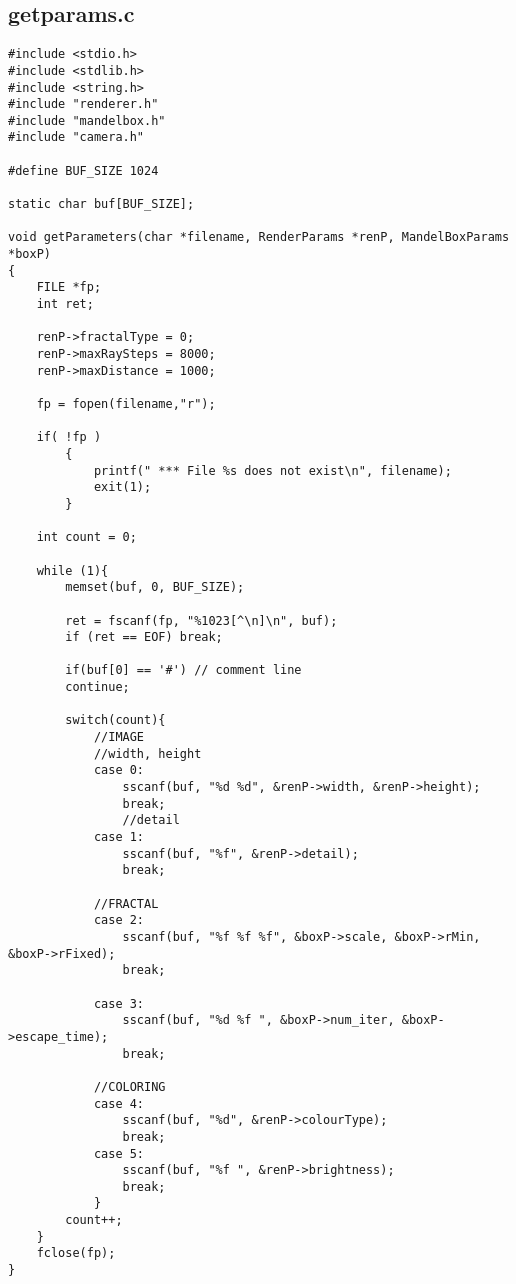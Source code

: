 \documentclass[]{article}
\begin{document}
\subsection*{getparams.c}
\begin{Verbatim}[fontsize= \footnotesize, tabsize=4]
#include <stdio.h>
#include <stdlib.h>
#include <string.h>
#include "renderer.h"
#include "mandelbox.h"
#include "camera.h"

#define BUF_SIZE 1024

static char buf[BUF_SIZE];

void getParameters(char *filename, RenderParams *renP, MandelBoxParams *boxP)
{
	FILE *fp;
	int ret;

	renP->fractalType = 0;
	renP->maxRaySteps = 8000;
	renP->maxDistance = 1000;

	fp = fopen(filename,"r");

	if( !fp )
		{
			printf(" *** File %s does not exist\n", filename);
			exit(1);
		}

	int count = 0;

	while (1){
		memset(buf, 0, BUF_SIZE);

		ret = fscanf(fp, "%1023[^\n]\n", buf);
		if (ret == EOF) break;

		if(buf[0] == '#') // comment line
		continue;

		switch(count){
			//IMAGE
			//width, height
			case 0:
				sscanf(buf, "%d %d", &renP->width, &renP->height);
				break;
				//detail
			case 1:
				sscanf(buf, "%f", &renP->detail);
				break;

			//FRACTAL
			case 2:
				sscanf(buf, "%f %f %f", &boxP->scale, &boxP->rMin, &boxP->rFixed);
				break;

			case 3:
				sscanf(buf, "%d %f ", &boxP->num_iter, &boxP->escape_time);
				break;

			//COLORING
			case 4:
				sscanf(buf, "%d", &renP->colourType);
				break;
			case 5:
				sscanf(buf, "%f ", &renP->brightness);
				break;
			}
		count++;
	}
	fclose(fp);
}
\end{Verbatim}
\end{document}
